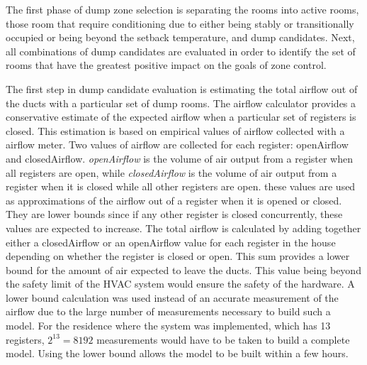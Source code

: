 The first phase of dump zone selection is separating the rooms into active
rooms, those room that require conditioning due to either being stably or
transitionally occupied or being beyond the setback temperature, and dump
candidates. Next, all combinations of dump candidates are evaluated in order to
identify the set of rooms that have the greatest positive impact on the goals of
zone control. 


The first step in dump candidate evaluation is estimating the total airflow out
of the ducts with a particular set of dump rooms. The airflow calculator
provides a conservative estimate of the expected airflow when a particular set
of registers is closed. This estimation is based on empirical values of airflow
collected with a airflow meter. Two values of airflow are collected for each
register: openAirflow and closedAirflow. {\em openAirflow} is the volume of air
output from a register when all registers are open, while {\em closedAirflow} is
the volume of air output from a register when it is closed while all other
registers are open. these values are used as approximations of the airflow out
of a register when it is opened or closed. They are lower bounds since if any
other register is closed concurrently, these values are expected to
increase. The total airflow is calculated by adding together either a
closedAirflow or an openAirflow value for each register in the house depending
on whether the register is closed or open. This sum provides a lower bound for
the amount of air expected to leave the ducts. This value being beyond the
safety limit of the HVAC system would ensure the safety of the hardware. A lower
bound calculation was used instead of an accurate measurement of the airflow due
to the large number of measurements necessary to build such a model. For the
residence where the system was implemented, which has 13 registers, $2^{13} =
8192$ measurements would have to be taken to build a complete model. Using the
lower bound allows the model to be built within a few hours.

